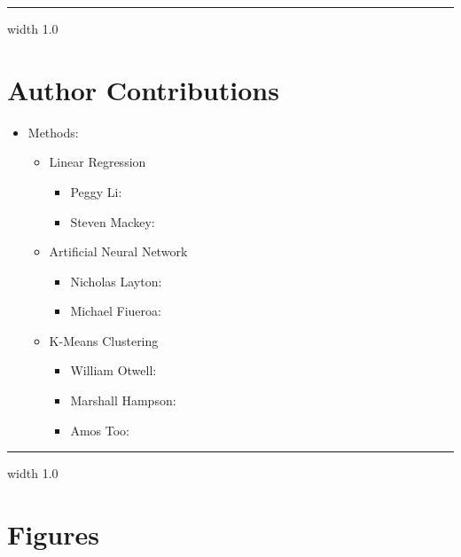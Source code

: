 \documentclass[12pt]{article}
\newcommand{\horizontalLine}{
	\begin{center}
		\hrule width 1.0\textwidth
	\end{center}
}
\begin{document}
\horizontalLine
\section{Author Contributions}
\label{sec:authorContributions}

\begin{itemize}
    \item Methods:
    \begin{itemize}
        \item Linear Regression
        \begin{itemize}
            \item Peggy Li:
            \item Steven Mackey:
        \end{itemize}
        \item Artificial Neural Network
        \begin{itemize}
            \item Nicholas Layton:
            \item Michael Fiueroa:
        \end{itemize}
        \item K-Means Clustering
        \begin{itemize}
            \item William Otwell:
            \item Marshall Hampson:
            \item Amos Too:
        \end{itemize}
    \end{itemize}
\end{itemize}

\horizontalLine
\appendix
\section{Figures}
\label{sec:figures}
\end{document}
